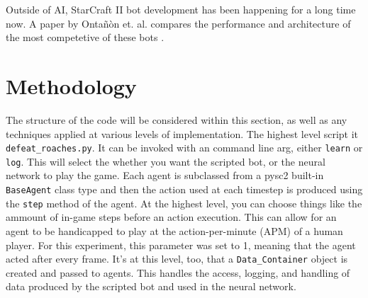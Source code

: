 \documentclass{amsart}
\theoremstyle{definition}
\begin{document}
Outside of AI, StarCraft II bot development has been happening for a long time now.
A paper by Onta\~n\`on et. al. compares the performance and architecture of the most competetive of these bots \cite{ontanon2013survey}.












\section{Methodology}


The structure of the code will be considered within this section, as well as any techniques applied at various levels of implementation.
The highest level script it {\tt defeat\_roaches.py}.
It can be invoked with an command line arg, either {\tt learn} or {\tt log}.
This will select the whether you want the scripted bot, or the neural network to play the game.
Each agent is subclassed from a pysc2 built-in {\tt BaseAgent} class type and then the action used at each timestep is produced using the {\tt step} method of the agent.
At the highest level, you can choose things like the ammount of in-game steps before an action execution.
This can allow for an agent to be handicapped to play at the action-per-minute (APM) of a human player.
For this experiment, this parameter was set to 1, meaning that the agent acted after every frame.
It's at this level, too, that a {\tt Data\_Container} object is created and passed to agents.
This handles the access, logging, and handling of data produced by the scripted bot and used in the neural network.
\end{document}
